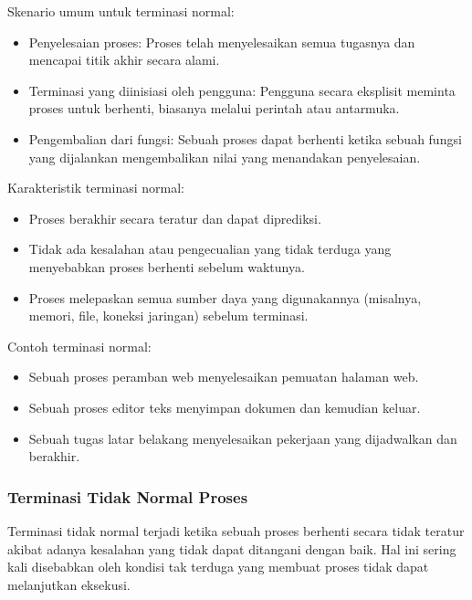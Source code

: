 \documentclass[12pt]{article}
\begin{document}
\begin{itemize}
    Skenario umum untuk terminasi normal:
    \begin{itemize} 
        \item Penyelesaian proses: Proses telah menyelesaikan semua tugasnya dan mencapai titik akhir secara alami.
        \item Terminasi yang diinisiasi oleh pengguna: Pengguna secara eksplisit meminta proses untuk berhenti, biasanya melalui perintah atau antarmuka.
        \item Pengembalian dari fungsi: Sebuah proses dapat berhenti ketika sebuah fungsi yang dijalankan mengembalikan nilai yang menandakan penyelesaian.
    \end{itemize}
    
    Karakteristik terminasi normal:
    \begin{itemize} 
        \item Proses berakhir secara teratur dan dapat diprediksi.
        \item Tidak ada kesalahan atau pengecualian yang tidak terduga yang menyebabkan proses berhenti sebelum waktunya.
        \item Proses melepaskan semua sumber daya yang digunakannya (misalnya, memori, file, koneksi jaringan) sebelum terminasi.
    \end{itemize}
    
    Contoh terminasi normal:
    \begin{itemize}
        \item Sebuah proses peramban web menyelesaikan pemuatan halaman web.
        \item Sebuah proses editor teks menyimpan dokumen dan kemudian keluar.
        \item Sebuah tugas latar belakang menyelesaikan pekerjaan yang dijadwalkan dan berakhir.
    \end{itemize}
    
    \subsubsection{Terminasi Tidak Normal Proses}
    
    Terminasi tidak normal terjadi ketika sebuah proses berhenti secara tidak teratur akibat adanya kesalahan yang tidak dapat ditangani dengan baik. Hal ini sering kali disebabkan oleh kondisi tak terduga yang membuat proses tidak dapat melanjutkan eksekusi.
    

\end{itemize}
\end{document}
